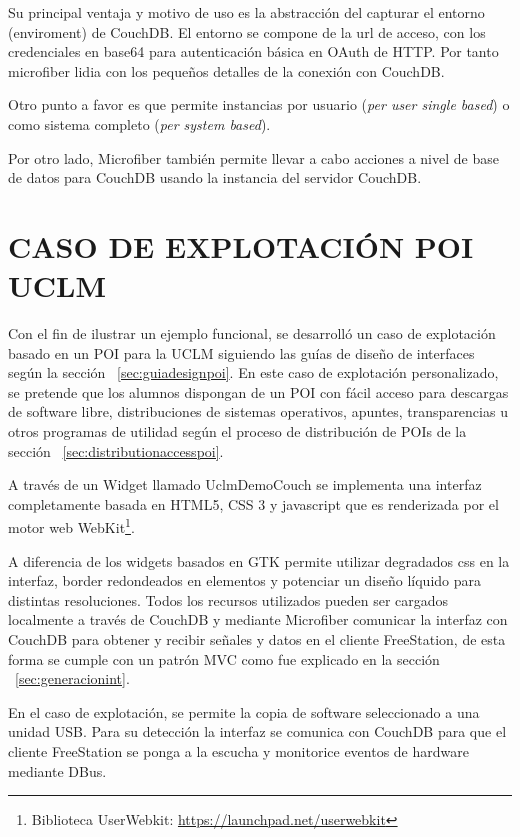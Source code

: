 Su principal ventaja y motivo de uso es la abstracción del capturar el entorno
(enviroment) de CouchDB. El entorno se compone de la url de acceso, con
los credenciales en base64 para autenticación básica en OAuth de HTTP.
Por tanto microfiber lidia con los pequeños detalles de la conexión con CouchDB.

Otro punto a favor es que permite instancias por usuario (\emph{per user single
based}) o como sistema completo (\emph{per system based}).

Por otro lado, Microfiber también permite llevar a cabo acciones a nivel de base
de datos para CouchDB usando la instancia del servidor CouchDB.

\section{\uppercase{Caso de explotación POI UCLM}}

Con el fin de ilustrar un ejemplo funcional, se desarrolló un caso de
explotación basado en un POI para la UCLM siguiendo las guías de diseño de
interfaces según la sección ~\ref{sec:guiadesignpoi}.
En este caso de explotación personalizado, se pretende que los alumnos 
dispongan de un POI con  fácil acceso para descargas de software libre,
distribuciones de sistemas operativos, apuntes, transparencias 
u otros programas de utilidad según el proceso de distribución de POIs de la
sección ~\ref{sec:distributionaccesspoi}.

A través de un Widget llamado UclmDemoCouch se implementa una interfaz
completamente basada en HTML5, CSS 3 y javascript que es renderizada por el
motor web WebKit\footnote{Biblioteca UserWebkit:
\url{https://launchpad.net/userwebkit}}.

A diferencia de los widgets basados en GTK permite utilizar degradados css en
la interfaz, border redondeados en elementos y potenciar un diseño líquido para
distintas resoluciones. Todos los recursos utilizados pueden ser cargados
localmente a través de CouchDB y mediante Microfiber comunicar la interfaz 
con CouchDB para obtener y recibir señales y datos en el cliente FreeStation,
de esta forma se cumple con un patrón MVC como fue explicado en la sección
~\ref{sec:generacionint}.

En el caso de explotación, se permite la copia de software seleccionado a una
unidad USB. Para su detección la interfaz se comunica con CouchDB para que el
cliente FreeStation se ponga a la escucha y monitorice eventos de hardware
mediante DBus.
 
